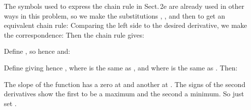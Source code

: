 {
{The symbols used to express the chain rule in Sect.\,2e are already used in other ways in this problem,
 so we make the substitutions , , and then 
 to get an equivalent chain rule:
 Comparing the left side to the desired derivative, we make the correspondence:
 Then the chain rule gives:
 }

{Define , so  hence  and:
%
%
}

{Define  giving  hence ,
 where  is the same as  , and where  is the same as .
 Then:
%
}

{The slope of the function has a zero at  and another at .
 The signs of the second derivatives show the first to be a maximum and the second a minimum.
 So just set .
}

}%
